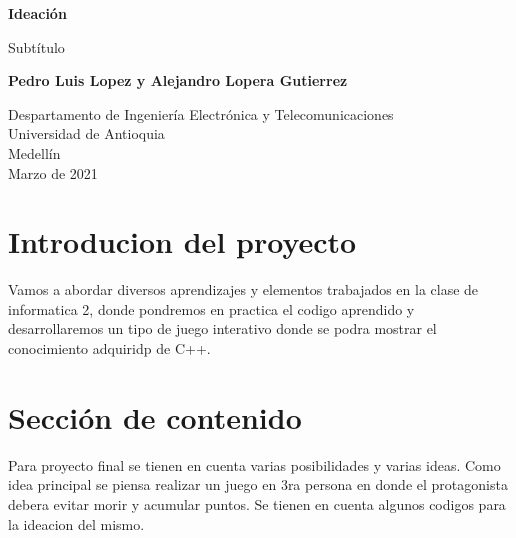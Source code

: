 \documentclass{article}
\begin{document}
\begin{titlepage}
    \begin{center}
        \vspace*{1cm}
            
        \Huge
        \textbf{Ideación}
            
        \vspace{0.5cm}
        \LARGE
        Subtítulo
            
        \vspace{1.5cm}
            
        \textbf{Pedro Luis Lopez y Alejandro Lopera Gutierrez}
            
        \vfill
            
        \vspace{0.8cm}
            
        \Large
        Despartamento de Ingeniería Electrónica y Telecomunicaciones\\
        Universidad de Antioquia\\
        Medellín\\
        Marzo de 2021
            
    \end{center}
\end{titlepage}

\tableofcontents
\newpage
\section{Introducion del proyecto}\label{intro}
Vamos a abordar diversos aprendizajes y elementos trabajados en la clase de informatica 2, donde pondremos en practica el codigo aprendido y desarrollaremos un tipo de juego interativo donde se podra mostrar el conocimiento adquiridp de C++.

\section{Sección de contenido} \label{contenido}
Para proyecto final se tienen en cuenta varias posibilidades y varias ideas. Como idea principal se piensa realizar un juego en 3ra persona en donde el protagonista debera evitar morir y acumular puntos. Se tienen en cuenta algunos codigos para la ideacion del mismo.







\end{document}
